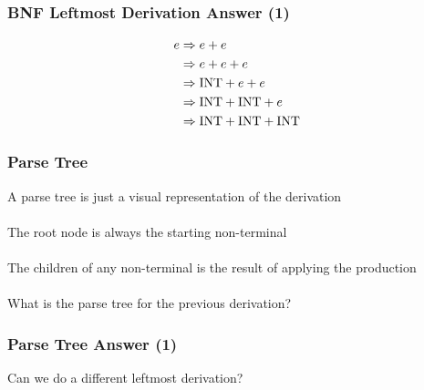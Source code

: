 \documentclass[aspectratio=169]{beamer}
\begin{document}
\begin{frame}
\frametitle{BNF Leftmost Derivation Answer (1)}

\begin{align*}
e &\Rightarrow e + e\\
  &\Rightarrow e + e + e\\
  &\Rightarrow \text{\lstinline{INT}} + e + e\\
  &\Rightarrow \text{\lstinline{INT}} + \text{\lstinline{INT}} + e\\
  &\Rightarrow \text{\lstinline{INT}} + \text{\lstinline{INT}} +
               \text{\lstinline{INT}}
\end{align*}
\end{frame}

\begin{frame}
\frametitle{Parse Tree}

A \alert{parse tree} is just a visual representation of the derivation\\~\\

The root node is always the \alert{starting non-terminal}\\~\\

The children of any \alert{non-terminal} is the result of applying the
\alert{production}\\~\\

What is the parse tree for the previous derivation?
\end{frame}

\begin{frame}
\frametitle{Parse Tree Answer (1)}

\begin{center}
\end{center}

Can we do a different leftmost derivation?
\end{frame}
\end{document}
